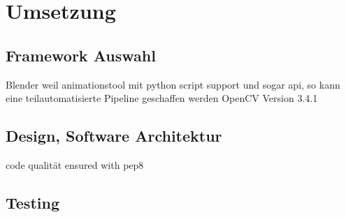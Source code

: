 \chapter{Umsetzung}
\section{Framework Auswahl}
Blender weil animationstool mit python script support und sogar api, so kann eine teilautomatisierte Pipeline geschaffen werden
OpenCV Version 3.4.1
\section{Design, Software Architektur}
code qualität ensured with pep8
\section{Testing}